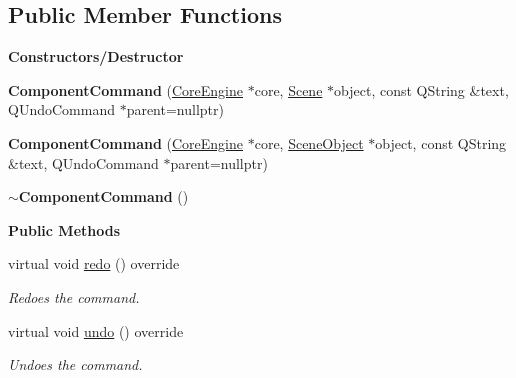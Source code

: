 \subsection*{Public Member Functions}
\begin{Indent}\textbf{ Constructors/\+Destructor}\par
\begin{DoxyCompactItemize}
\item 
\mbox{\label{classrev_1_1_component_command_a620ebad0f454245b20a72f800996791f}} 
{\bfseries Component\+Command} (\mbox{\hyperlink{classrev_1_1_core_engine}{Core\+Engine}} $\ast$core, \mbox{\hyperlink{classrev_1_1_scene}{Scene}} $\ast$object, const Q\+String \&text, Q\+Undo\+Command $\ast$parent=nullptr)
\item 
\mbox{\label{classrev_1_1_component_command_a672e3a27215dcb1c6a54a3d2ae36c9de}} 
{\bfseries Component\+Command} (\mbox{\hyperlink{classrev_1_1_core_engine}{Core\+Engine}} $\ast$core, \mbox{\hyperlink{classrev_1_1_scene_object}{Scene\+Object}} $\ast$object, const Q\+String \&text, Q\+Undo\+Command $\ast$parent=nullptr)
\item 
\mbox{\label{classrev_1_1_component_command_aec04cde2cc99f497c99386a8b8b1ca79}} 
{\bfseries $\sim$\+Component\+Command} ()
\end{DoxyCompactItemize}
\end{Indent}
\begin{Indent}\textbf{ Public Methods}\par
\begin{DoxyCompactItemize}
\item 
\mbox{\label{classrev_1_1_component_command_aae80875b6d800510998da9f51c9dcafd}} 
virtual void \mbox{\hyperlink{classrev_1_1_component_command_aae80875b6d800510998da9f51c9dcafd}{redo}} () override
\begin{DoxyCompactList}\small\item\em Redoes the command. \end{DoxyCompactList}\item 
\mbox{\label{classrev_1_1_component_command_a31a932e9812bb5b3b967b4e370bf193a}} 
virtual void \mbox{\hyperlink{classrev_1_1_component_command_a31a932e9812bb5b3b967b4e370bf193a}{undo}} () override
\begin{DoxyCompactList}\small\item\em Undoes the command. \end{DoxyCompactList}\end{DoxyCompactItemize}
\end{Indent}
